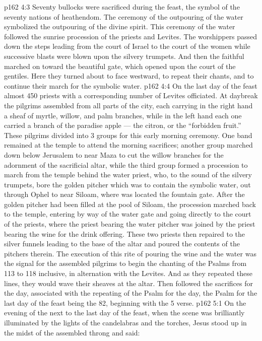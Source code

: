 \vs p162 4:3 Seventy bullocks were sacrificed during the feast, the symbol of the seventy nations of heathendom. The ceremony of the outpouring of the water symbolized the outpouring of the divine spirit. This ceremony of the water followed the sunrise procession of the priests and Levites. The worshippers passed down the steps leading from the court of Israel to the court of the women while successive blasts were blown upon the silvery trumpets. And then the faithful marched on toward the beautiful gate, which opened upon the court of the gentiles. Here they turned about to face westward, to repeat their chants, and to continue their march for the symbolic water.
\vs p162 4:4 \pc On the last day of the feast almost 450 priests with a corresponding number of Levites officiated. At daybreak the pilgrims assembled from all parts of the city, each carrying in the right hand a sheaf of myrtle, willow, and palm branches, while in the left hand each one carried a branch of the paradise apple --- the citron, or the “forbidden fruit.” These pilgrims divided into 3 groups for this early morning ceremony. One band remained at the temple to attend the morning sacrifices; another group marched down below Jerusalem to near Maza to cut the willow branches for the adornment of the sacrificial altar, while the third group formed a procession to march from the temple behind the water priest, who, to the sound of the silvery trumpets, bore the golden pitcher which was to contain the symbolic water, out through Ophel to near Siloam, where was located the fountain gate. After the golden pitcher had been filled at the pool of Siloam, the procession marched back to the temple, entering by way of the water gate and going directly to the court of the priests, where the priest bearing the water pitcher was joined by the priest bearing the wine for the drink offering. These two priests then repaired to the silver funnels leading to the base of the altar and poured the contents of the pitchers therein. The execution of this rite of pouring the wine and the water was the signal for the assembled pilgrims to begin the chanting of the Psalms from 113 to 118 inclusive, in alternation with the Levites. And as they repeated these lines, they would wave their sheaves at the altar. Then followed the sacrifices for the day, associated with the repeating of the Psalm for the day, the Psalm for the last day of the feast being the 82, beginning with the 5 verse.
\vs p162 5:1 On the evening of the next to the last day of the feast, when the scene was brilliantly illuminated by the lights of the candelabras and the torches, Jesus stood up in the midst of the assembled throng and said:
